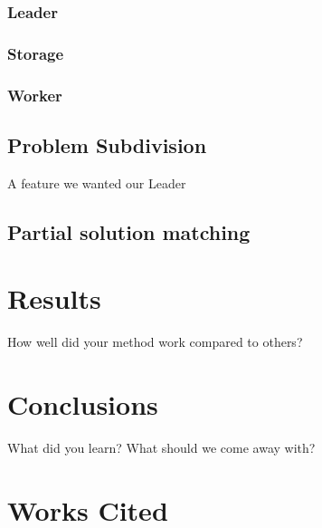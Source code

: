 \documentclass[11pt]{article}
\begin{document}
\subsubsection{Leader}

\subsubsection{Storage}

\subsubsection{Worker}



\subsection{Problem Subdivision}

A feature we wanted our Leader

\subsection{Partial solution matching}


\section{Results}

How well did your method work compared to others?

\section{Conclusions} 

What did you learn? What should we come away with?


\section{Works Cited}
\end{document}
